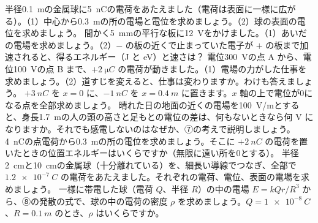 \bkendproblems
{}
\bkproblem 半径\qty{0.1}{m}の金属球に\qty{5}{nC}の電荷をあたえました（電荷は表面に一様に広がる）。（1）中心から\qty{0.3}{m}の所の電場と電位を求めましょう。（2）球の表面の電位を求めましょう。
\bkproblem 間かく\qty{5}{mm}の平行な板に\qty{12}{V}をかけました。（1）あいだの電場を求めましょう。（2）$-$ の板の近くで止まっていた電子が $+$ の板まで加速されると、得るエネルギー（J と eV）と速さは？
\bkproblem 電位\qty{300}{V}の点 A から、電位\qty{100}{V}の点 B まで、$+\qty{2}{\micro C}$ の電荷が動きました。（1）電場の力がした仕事を求めましょう。（2）道すじを変えると、仕事は変わりますか。わけも答えましょう。
\bkproblem $+\qty{3}{nC}$ を $x=0$ に、$-\qty{1}{nC}$ を $x=\qty{0.4}{m}$ に置きます。$x$ 軸の上で電位が0になる点を全部求めましょう。
\bkproblem 晴れた日の地面の近くの電場を\qty{100}{V/m}とすると、身長\qty{1.7}{m}の人の頭の高さと足もとの電位の差は、何もないときなら何 V になりますか。それでも感電しないのはなぜか、⑦の考えで説明しましょう。
\bkproblem \qty{4}{nC}の点電荷から\qty{0.3}{m}の所の電位を求めましょう。そこに $+\qty{2}{nC}$ の電荷を置いたときの位置エネルギーはいくらですか（無限に遠い所を0とする）。
\bkproblem 半径\qty{2}{cm}と\qty{10}{cm}の金属球（十分離れている）を、細長い導線でつなぎ、全部で $\qty{1.2e-7}{C}$ の電荷をあたえました。それぞれの電荷、電位、表面の電場を求めましょう。
\bkproblem 一様に帯電した球（電荷 $Q$、半径 $R$）の中の電場 $E=kQr/R^3$ から、⑧の発散の式で、球の中の電荷の密度 $\rho$ を求めましょう。$Q=\qty{1e-8}{C}$、$R=\qty{0.1}{m}$ のとき、$\rho$ はいくらですか。
